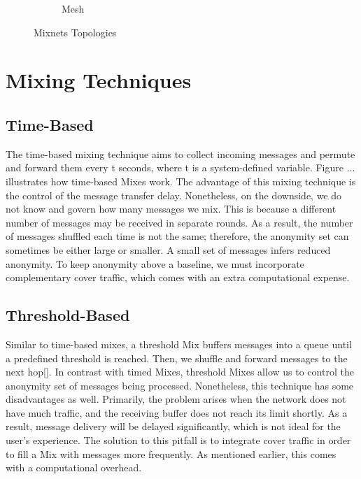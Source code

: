 \documentclass[logo,msc,cyber]{infthesis}   %
\begin{document}
\begin{figure}[h!]
\begin{subfigure}[b]{0.45\textwidth}
        \caption{Mesh}
        \label{fig:mesh}
    \end{subfigure}
       \caption{Mixnets Topologies}
       \label{fig:mixnets-topologies}
\end{figure}

\section{Mixing Techniques}

\subsection{Time-Based}
The time-based mixing technique aims to collect incoming messages and permute
and forward them every t seconds, where t is a system-defined variable. Figure
... illustrates how time-based Mixes work. The advantage of this mixing
technique is the control of the message transfer delay. Nonetheless, on the
downside, we do not know and govern how many messages we mix. This is because a
different number of messages may be received in separate rounds. As a result,
the number of messages shuffled each time is not the same; therefore, the
anonymity set can sometimes be either large or smaller. A small set of messages
infers reduced anonymity. To keep anonymity above a baseline, we must
incorporate complementary cover traffic, which comes with an extra computational
expense.

\subsection{Threshold-Based}
Similar to time-based mixes, a threshold Mix buffers messages into a queue until
a predefined threshold is reached. Then, we shuffle and forward messages to the
next hop[]. In contrast with timed Mixes, threshold Mixes allow us to control
the anonymity set of messages being processed. Nonetheless, this technique has
some disadvantages as well. Primarily, the problem arises when the network does
not have much traffic, and the receiving buffer does not reach its limit
shortly. As a result, message delivery will be delayed significantly, which is
not ideal for the user's experience. The solution to this pitfall is to
integrate cover traffic in order to fill a Mix with messages more frequently. As
mentioned earlier, this comes with a computational overhead. 
\end{document}
